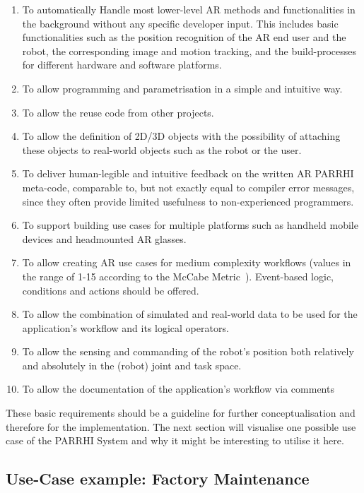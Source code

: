 \begin{enumerate}
	\setlength\itemsep{-1em}
	\item To automatically Handle most lower-level AR methods and functionalities in the background without any specific developer input. This includes basic functionalities such as the position recognition of the AR end user and the robot, the corresponding image and motion tracking, and the build-processes for different hardware and software platforms.
	\item To allow programming and parametrisation in a simple and intuitive way.
	\item To allow the reuse code from other projects.
	\item To allow the definition of 2D/3D objects with the possibility of attaching these objects to real-world objects such as the robot or the user.
	\item To deliver human-legible and intuitive feedback on the written AR PARRHI meta-code, comparable to, but not exactly equal to compiler error messages, since they often provide limited usefulness to non-experienced programmers.
	\item To support building use cases for multiple platforms such as handheld mobile devices and headmounted AR glasses.
	\item To allow creating AR use cases for medium complexity workflows (values in the range of 1-15 according to the McCabe Metric~\cite{mccabe1976complexity}). Event-based logic, conditions and actions should be offered.
	\item To allow the combination of simulated and real-world data to be used for the application's workflow and its logical operators.
	\item To allow the sensing and commanding of the robot's position both relatively and absolutely in the (robot) joint and task space.
	\item To allow the documentation of the application's workflow via comments
\end{enumerate}

These basic requirements should be a guideline for further conceptualisation and therefore for the implementation. The next section will visualise one possible use case of the PARRHI System and why it might be interesting to utilise it here.

\subsection{Use-Case example: Factory Maintenance} \label{Section:UseCaseDefinition}

